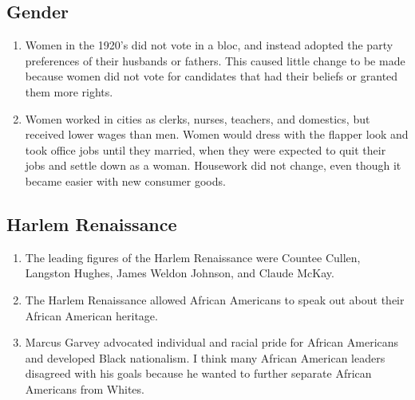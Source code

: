 \documentclass[12pt]{article} %
\begin{document}
\subsection{Gender}
\begin{enumerate}[resume]
	\item Women in the 1920's did not vote in a bloc, and instead adopted the party preferences of their
		husbands or fathers. This caused little change to be made because women did not vote for candidates
		that had their beliefs or granted them more rights.
	\item Women worked in cities as clerks, nurses, teachers, and domestics, but received lower wages than
		men. Women would dress with the flapper look and took office jobs until they married, when they were
		expected to quit their jobs and settle down as a woman. Housework did not change, even though it became
		easier with new consumer goods.
\end{enumerate}
\subsection{Harlem Renaissance}
\begin{enumerate}[resume]
	\item The leading figures of the Harlem Renaissance were Countee Cullen, Langston Hughes, 
		James Weldon Johnson, and Claude McKay.
	\item The Harlem Renaissance allowed African Americans to speak out about their African American heritage.
	\item Marcus Garvey advocated individual and racial pride for African Americans and developed Black nationalism.
		I think many African American leaders disagreed with his goals because he wanted to further separate 
		African Americans from Whites.
\end{enumerate}
\end{document}
